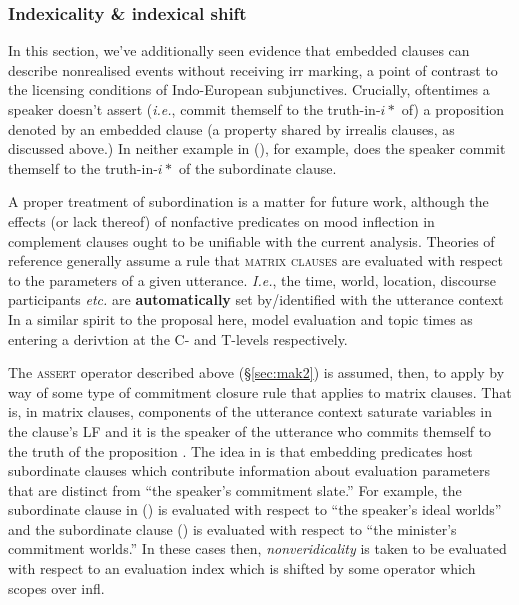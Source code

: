 \subsubsection{Indexicality \& indexical shift}

In this section, we've additionally seen evidence that embedded clauses can describe nonrealised events without receiving \gls{irr} marking, a point of contrast to the licensing conditions of Indo-European subjunctives. Crucially, oftentimes a speaker doesn't assert (\textit{i.e.}, commit themself to the truth-in-$ i* $ of) a proposition denoted by an embedded clause (a property shared by irrealis clauses, as discussed above.) In neither example in (), for example, does the speaker commit themself to the truth-in-$ i* $ of the subordinate clause.

A proper treatment of subordination is a matter for future work, although the effects (or lack thereof) of nonfactive predicates on mood inflection in complement clauses ought to be unifiable with the current analysis. Theories of reference generally assume a rule that \textsc{matrix clauses} are evaluated with respect to the parameters of a given utterance. \textit{I.e.}, the time, world, location, discourse participants \textit{etc.} are \textbf{automatically} set by/identified with the utterance context \citetext{\citealp[see][]{Tonhauser2011} for an implementation.} In a similar spirit to the proposal here, \citet{Pancheva2019a} model evaluation and topic times as entering a derivtion at the C- and T-levels respectively.


The \textsc{assert} operator described above (\S\ref{sec:mak2}) is assumed, then, to apply by way of some type of commitment closure rule that applies to matrix clauses. That is, in matrix clauses, components of the utterance context saturate variables in the clause's LF and it is the speaker of the utterance who commits themself to the truth of the proposition \citep[\textit{cf.}][]{Krifka2021}. The idea in \citet[ \S~4]{Krifka2021} is that embedding predicates host subordinate clauses which contribute information about evaluation parameters that are distinct from ``the speaker's commitment slate.'' For example, the subordinate clause in () is evaluated with respect to ``the speaker's ideal worlds'' and the subordinate clause  () is evaluated with respect to ``the minister's commitment worlds.'' In these cases then, \textit{nonveridicality} is taken to be evaluated with respect to an evaluation index which is shifted by some operator which scopes over \gls{infl}.


